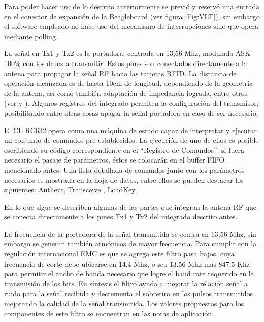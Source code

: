 Para poder hacer uso de lo descrito anteriormente se previó y reservó una entrada en el conector de expansión de la Beagleboard (ver figura \ref{Fig:VLT}), sin embargo el software empleado no hace uso del mecanismo de interrupciones sino que opera mediante polling.

\bigskip
{}

La señal en Tx1 y Tx2 es la portadora, centrada en 13,56 Mhz, modulada ASK 100\% con los datos a transmitir. Estos pines son conectados directamente a la antena para propagar la señal RF hacia las tarjetas RFID. La distancia de operación alcanzada es de hasta 10cm de longitud, dependiendo de la geometría de la antena, así como también adaptación de impedancia lograda, entre otros (ver \cite{MRICF} y \cite{RFIDPA}).
Algunos registros del integrado permiten la configuración del transmisor, posibilitando entre otras cosas apagar la señal portadora en caso de ser necesario.

\bigskip
{}

El CL RC632 opera como una máquina de estado capaz de interpretar y ejecutar un conjunto de comandos pre establecidos. La ejecución de uno de ellos es posible escribiendo su código correspondiente en el “Registro de Comandos”, si fuera necesario el pasaje de parámetros, éstos se colocarán en el buffer FIFO mencionado antes. 
Una lista detallada de comandos junto con los parámetros necesarios es mostrada en la hoja de datos, entre ellos se pueden destacar los siguientes: Authent, Transceive , LoadKey.

\bigskip
{}

En lo que sigue se describen algunas de las partes que integran la antena RF que se conecta directamente a los pines Tx1 y Tx2 del integrado descrito antes.

\bigskip
{}

La frecuencia de la portadora de la señal transmitida se centra en 13,56 Mhz, sin embargo se generan también armónicos de mayor frecuencia. Para cumplir con la regulación internacional EMC es que se agrega este filtro pasa bajos, cuya frecuencia de corte debe ubicarse en 14,4 Mhz, o sea 13,56 Mhz más 847,5 Khz para permitir el ancho de banda necesario que logre el baud rate requerido en la transmisión de los bits. 
En síntesis el filtro ayuda a mejorar la relación señal a ruido para la señal recibida y decrementa el sobretiro en los pulsos transmitidos mejorando la calidad de la señal transmitida.
Los valores propuestos para los componentes de este filtro se encuentran en las notas de aplicación \cite{MRICF}.

